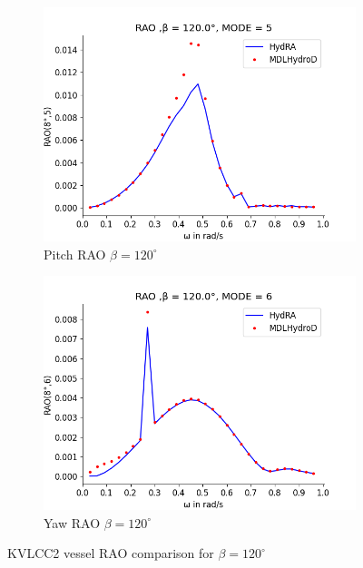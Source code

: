 \begin{figure}[H]
\begin{subfigure}[b]{0.49\textwidth}
        \includegraphics[width=\textwidth]{plots/kvlcc/rao/rao5.png}
        \caption{Pitch RAO $\beta = 120^{\circ}$}
    \end{subfigure}
    \begin{subfigure}[b]{0.49\textwidth}
        \includegraphics[width=\textwidth]{plots/kvlcc/rao/rao6.png}
        \caption{Yaw RAO $\beta = 120^{\circ}$}
    \end{subfigure}
    \caption{KVLCC2 vessel RAO comparison for $\beta = 120^{\circ}$}
    \label{fig:kvlcc_rao_120}
\end{figure}
